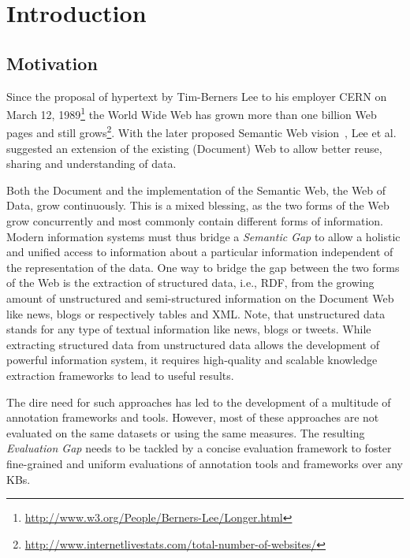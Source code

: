 \chapter{Introduction}

\section*{Motivation}

Since the proposal of hypertext by Tim-Berners Lee to his employer CERN on March 12, 1989\footnote{\url{http://www.w3.org/People/Berners-Lee/Longer.html}} the World Wide Web has grown more than one billion Web pages and still grows\footnote{\url{http://www.internetlivestats.com/total-number-of-websites/}}.
With the later proposed Semantic Web vision~\cite{bernerslee2001semantic}, Lee et al. suggested an extension of the existing (Document) Web to allow better reuse, sharing and understanding of data.

Both the Document and the implementation of the Semantic Web, the Web of Data, grow continuously. 
This is a mixed blessing, as the two forms of the Web grow concurrently and most commonly contain different forms of information. 
Modern information systems must thus bridge a \emph{Semantic Gap} to allow a holistic and unified access to information about a particular information independent of the representation of the data.
One way to bridge the gap between the two forms of the Web is the extraction of structured data, i.e., \ac{RDF}, from the growing amount of unstructured and semi-structured information on the Document Web like news, blogs or respectively tables and XML.
Note, that unstructured data stands for any type of textual information like news, blogs or tweets. 
While extracting structured data from unstructured data allows the development of powerful information system, it requires high-quality and scalable knowledge extraction frameworks to lead to useful results. 

The dire need for such approaches has led to the development of a multitude of annotation frameworks and tools. 
However, most of these approaches are not evaluated on the same datasets or using the same measures.
The resulting \emph{Evaluation Gap} needs to be tackled by a concise evaluation framework to foster fine-grained and uniform evaluations of annotation tools and frameworks over any \ac{KB}s.

